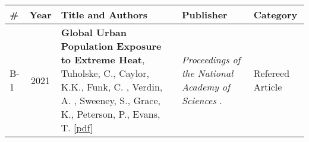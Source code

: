 
\begin{longtable}{lcp{7.75cm}>{\raggedright}p{5.25cm}p{1.75cm}}
\# & Year & Title and Authors & Publisher & Category\\
\hline 
\endhead 
    B-1 & 2021 & {\bf Global Urban Population Exposure to Extreme Heat}, Tuholske, C., Caylor, K.K., Funk, C. , Verdin, A. , Sweeney, S., Grace, K., Peterson, P., Evans, T. \href{https://ucsb.box.com/s/icns64f0p22sneu23nmw5zx0gphsfdws}{[pdf]} & \emph{ Proceedings of the National Academy of Sciences } .   & Refereed Article\\
\end{longtable}

